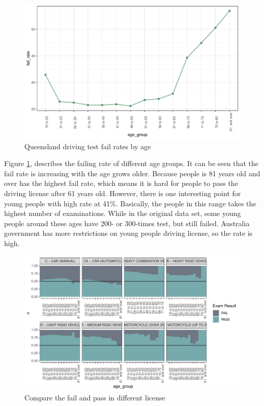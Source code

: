 \documentclass[11pt,a4paper,]{article}
\begin{document}
\begin{figure}

{\centering \includegraphics{Assignment4_files/figure-latex/failrate-1} 

}

\caption{Queensland driving test fail rates by age}\label{fig:failrate}
\end{figure}

Figure \ref{fig:failrate}, describes the failing rate of different age groups. It can be seen that the fail rate is increasing with the age grows older. Because people is 81 years old and over has the highest fail rate, which means it is hard for people to pass the driving license after 61 years old. However, there is one interesting point for young people with high rate at 41\%. Basically, the people in this range takes the highest number of examinations. While in the original data set, some young people around these ages have 200- or 300-times test, but still failed. Australia government has more restrictions on young people driving license, so the rate is high.

\begin{figure}

{\centering \includegraphics{Assignment4_files/figure-latex/license-1} 

}

\caption{Compare the fail and pass in different license}\label{fig:license}
\end{figure}
\end{document}
